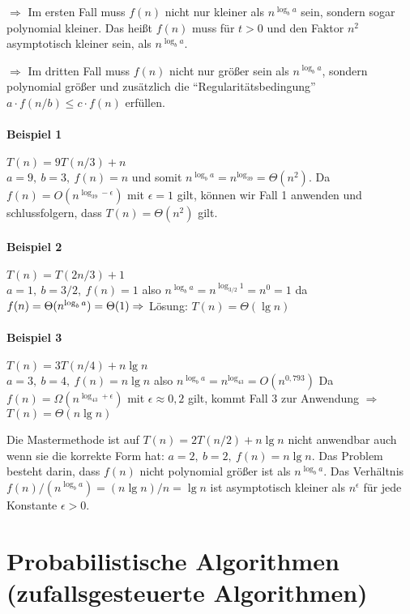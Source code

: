 \documentclass[a4paper]{scrartcl}
\begin{document}
$\Longrightarrow$ Im ersten Fall muss $f(n)$ nicht nur kleiner als $n^{\log_ba}$ sein, sondern sogar polynomial kleiner. Das heißt $f(n)$
      muss für $t>0$ und den Faktor $n^2$ asymptotisch kleiner sein, als $n^{\log_ba}$.
      
$\Longrightarrow$ Im dritten Fall muss $f(n)$ nicht nur größer sein als $n^{\log_ba}$, sondern polynomial größer und zusätzlich die
      "`Regularitätsbedingung"' $a \cdot f(n/b) \leq c \cdot f(n)$ erfüllen.
      
\paragraph{Beispiel 1} $T(n) = 9T(n/3)+n$\\
	$a=9,\ b=3,\ f(n)=n$ und somit $n^{\log_ba}=n^{\log_39}=\Theta(n^2)$. Da $f(n)=O(n^{\log_39-\epsilon})$ mit $\epsilon = 1$ gilt, können wir
	Fall 1 anwenden und schlussfolgern, dass $T(n)=\Theta(n^2)$ gilt.
	
\paragraph{Beispiel 2} $T(n) = T(2n/3)+1$\\
	$a=1,\ b=3/2,\ f(n)=1$ also $n^{\log_ba}=n^{\log_{3/2}1}=n^0=1$ da $f(n) = \Theta(n^{\log_ba}) = \Theta(1) \Rightarrow$ Lösung: $T(n)=\Theta(\lg n)$

\paragraph{Beispiel 3} $T(n) = 3T(n/4)+n \lg n$\\
	$a=3,\ b=4,\ f(n)=n \lg n$ also $n^{\log_ba}=n^{\log_43}=O(n^{0,793})$ Da $f(n)=\Omega(n^{\log_43+\epsilon})$ mit $\epsilon \approx 0,2$ 
	gilt, kommt Fall 3 zur Anwendung $\Rightarrow$ $T(n) = \Theta(n \lg n)$

\bigskip Die Mastermethode ist auf $T(n)=2T(n/2) + n \lg n$ nicht anwendbar auch wenn sie die korrekte Form hat: $a=2,\ b=2,\ f(n)=n \lg n$.
Das Problem besteht darin, dass $f(n)$ nicht polynomial größer ist als $n^{\log_b a}$.
Das Verhältnis $f(n)/(n^{\log_b a}) = (n \lg n)/n = \lg n$ ist asymptotisch kleiner als $n^\epsilon$ für jede Konstante $\epsilon > 0$.



\section{Probabilistische Algorithmen (zufallsgesteuerte Algorithmen)}
\end{document}

